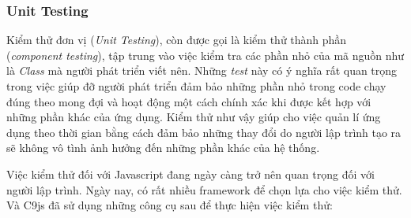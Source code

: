 \documentclass[12pt,a4paper,twoside]{article}
\begin{document}
\subsubsection{Unit Testing}
Kiểm thử đơn vị (\textit{Unit Testing}), còn được gọi là kiểm thử thành phần (\textit{component testing}), tập trung vào việc kiểm tra các phần nhỏ của mã nguồn như là \textit{Class} mà người phát triển viết nên. Những \textit{test} này có ý nghĩa rất quan trọng trong việc giúp đỡ người phát triển đảm bảo những phần nhỏ trong code chạy đúng theo mong đợi và hoạt động một cách chính xác khi được kết hợp với những phần khác của ứng dụng. Kiểm thử như vậy giúp cho việc quản lí ứng dụng theo thời gian bằng cách đảm bảo những thay đổi do người lập trình tạo ra sẽ không vô tình ảnh hưởng đến những phần khác của hệ thống.

Việc kiểm thử đối với Javascript đang ngày càng trở nên quan trọng đối với người lập trình. Ngày nay, có rất nhiều framework để chọn lựa cho việc kiểm thử. Và C9js đã sử dụng những công cụ sau để thực hiện việc kiểm thử:
\end{document}
